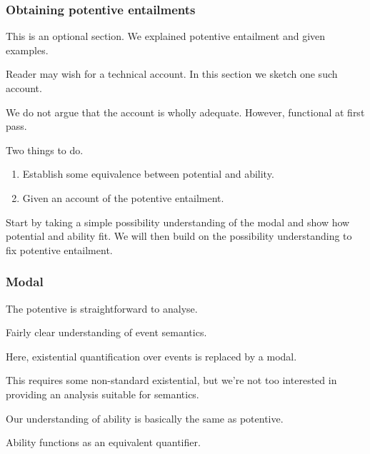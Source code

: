 \subsubsection{Obtaining potentive entailments}
\label{sec:obta-potent-enta}

\begin{note}
  This is an optional section.
  We explained potentive entailment and given examples.

  Reader may wish for a technical account.
  In this section we sketch one such account.

  We do not argue that the account is wholly adequate.
  However, functional at first pass.

  Two things to do.
  \begin{enumerate}
  \item Establish some equivalence between potential and ability.
  \item Given an account of the potentive entailment.
  \end{enumerate}

  Start by taking a simple possibility understanding of the modal and show how potential and ability fit.
  We will then build on the possibility understanding to fix potentive entailment.
\end{note}

\subsubsection{Modal}
\label{sec:modal}

\begin{note}[Potentive]
  The potentive is straightforward to analyse.

  Fairly clear understanding of event semantics.

  Here, existential quantification over events is replaced by a modal.

  This requires some non-standard existential, but we're not too interested in providing an analysis suitable for semantics.
\end{note}

\begin{note}[Ability]
  Our understanding of ability is basically the same as potentive.

  Ability functions as an equivalent quantifier.
\end{note}

